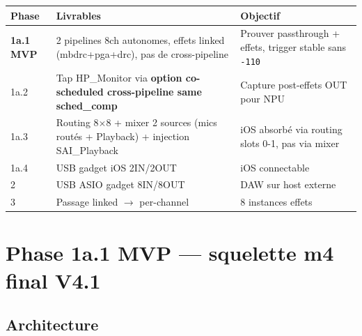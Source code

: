 \documentclass[11pt,a4paper]{article}
\begin{document}
\begin{center}
\begin{tabularx}{\textwidth}{llX}
\toprule
\textbf{Phase} & \textbf{Livrables} & \textbf{Objectif} \\
\midrule
\textbf{1a.1 MVP} & 2 pipelines 8ch autonomes, effets linked (mbdrc+pga+drc), pas de cross-pipeline & Prouver passthrough + effets, trigger stable sans \texttt{-110} \\
1a.2 & Tap HP\_Monitor via \textbf{option co-scheduled cross-pipeline same sched\_comp} & Capture post-effets OUT pour NPU \\
1a.3 & Routing 8$\times$8 + mixer 2 sources (mics routés + Playback) + injection SAI\_Playback & iOS absorbé via routing slots 0-1, pas via mixer \\
1a.4 & USB gadget iOS 2IN/2OUT & iOS connectable \\
2 & USB ASIO gadget 8IN/8OUT & DAW sur host externe \\
3 & Passage linked $\to$ per-channel & 8 instances effets \\
\bottomrule
\end{tabularx}
\end{center}

\section{Phase 1a.1 MVP --- squelette m4 final V4.1}

\subsection{Architecture}

\begin{center}
\end{center}
\end{document}
